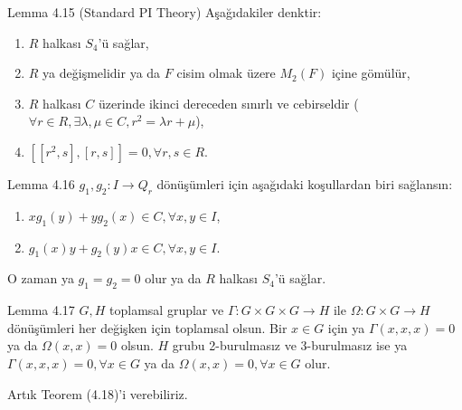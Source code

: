 \documentclass{beamer}
\begin{document}
\begin{frame}

\begin{block}{Lemma 4.15 (Standard PI Theory)}
Aşağıdakiler denktir:
\begin{enumerate}
    \item $R$ halkası $S_4$'ü sağlar,
    \item $R$ ya değişmelidir ya da $F$ cisim olmak üzere $M_2(F)$ içine gömülür,
    \item $R$ halkası $C$ üzerinde ikinci dereceden sınırlı ve cebirseldir ($\forall r \in R, \exists \lambda, \mu \in C, r^2 = \lambda r + \mu$),
    \item $[[r^2,s],[r,s]] = 0, \forall r, s \in R$.
\end{enumerate}
\end{block}
    
\end{frame}

\begin{frame}

\begin{block}{Lemma 4.16}
$g_1, g_2 \colon I \to Q_r$ dönüşümleri için aşağıdaki koşullardan biri sağlansın:
\begin{enumerate}
    \item $x g_1(y) + y g_2(x) \in C, \forall x, y \in I$,
    \item $g_1(x)y + g_2(y)x \in C, \forall x, y \in I$.
\end{enumerate}
O zaman ya $g_1 = g_2 = 0$ olur ya da $R$ halkası $S_4$'ü sağlar.
\end{block}
    
\end{frame}

\begin{frame}

\begin{block}{Lemma 4.17}
$G, H$ toplamsal gruplar ve $\Gamma \colon G \times G \times G \to H$ ile $\Omega \colon G \times G \to H$ dönüşümleri her değişken için toplamsal olsun. Bir $x \in G$ için ya $\Gamma(x,x,x) = 0$ ya da $\Omega(x,x) = 0$ olsun. $H$ grubu 2-burulmasız ve 3-burulmasız ise ya $\Gamma(x,x,x) = 0, \forall x \in G$ ya da $\Omega(x,x) = 0, \forall x \in G$ olur.
\end{block}

Artık Teorem (4.18)'i verebiliriz.
    
\end{frame}
\end{document}
